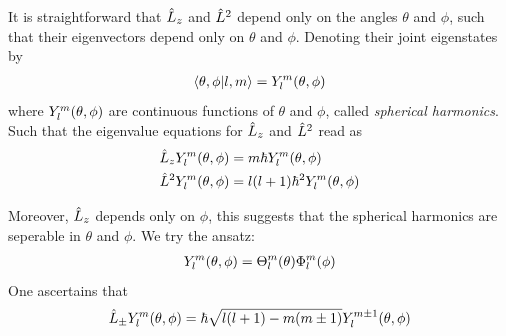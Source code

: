 It is straightforward that $\hat{L}_z$ and $\hat{L}^2$ depend only on the angles $\theta$ and $\phi$, such that their eigenvectors depend only on $\theta$ and $\phi$. Denoting their joint eigenstates by 
\begin{align}
    \braket{\theta,\phi|l,m} = Y_l^m (\theta,\phi)
\end{align}
where $Y_l^m (\theta, \phi)$ are continuous functions of $\theta$ and $\phi$, called \textit{spherical harmonics}. Such that the eigenvalue equations for $\hat{L}_z$ and $\hat{L}^2$ read as 
\begin{align}
    \hat{L}_z Y_l^m (\theta,\phi) &= m \hbar Y_l^m (\theta,\phi) \label{eq:eigen_lz_spherical}\\
    \hat{L}^2 Y_l^m (\theta,\phi) &= l(l+1) \hbar^2 Y_l^m (\theta,\phi) \label{eq:eigen_lsquare_spherical}
\end{align}

Moreover, $\hat{L}_z$ depends only on $\phi$, this suggests that the spherical harmonics are seperable in $\theta$ and $\phi$. We try the ansatz:
\begin{align}
    Y_l^m (\theta,\phi) = \Theta_l^m(\theta) \Phi_l^m(\phi) \label{eq:seperation_Ylm}
\end{align}
One ascertains that 
\begin{align}
    \hat{L}_{\pm} Y_l^m (\theta,\phi) = \hbar \sqrt{l(l+1) - m(m \pm 1)} Y_l^{m \pm 1} (\theta,\phi)
\end{align}

